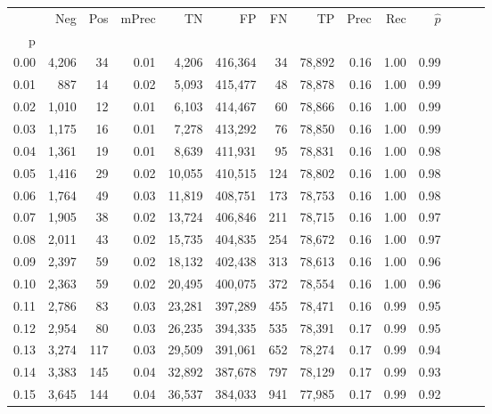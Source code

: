 \begin{tabular}{rrrrrrrrrrrrrr}
\toprule
{} &    Neg &    Pos & mPrec &       TN &       FP &      FN &      TP &  Prec &   Rec & $\hat{p}$ \\
p    &        &        &       &          &          &         &         &       &       &           \\
\midrule
0.00 &  4,206 &     34 &  0.01 &    4,206 &  416,364 &      34 &  78,892 &  0.16 &  1.00 &      0.99 \\
0.01 &    887 &     14 &  0.02 &    5,093 &  415,477 &      48 &  78,878 &  0.16 &  1.00 &      0.99 \\
0.02 &  1,010 &     12 &  0.01 &    6,103 &  414,467 &      60 &  78,866 &  0.16 &  1.00 &      0.99 \\
0.03 &  1,175 &     16 &  0.01 &    7,278 &  413,292 &      76 &  78,850 &  0.16 &  1.00 &      0.99 \\
0.04 &  1,361 &     19 &  0.01 &    8,639 &  411,931 &      95 &  78,831 &  0.16 &  1.00 &      0.98 \\
0.05 &  1,416 &     29 &  0.02 &   10,055 &  410,515 &     124 &  78,802 &  0.16 &  1.00 &      0.98 \\
0.06 &  1,764 &     49 &  0.03 &   11,819 &  408,751 &     173 &  78,753 &  0.16 &  1.00 &      0.98 \\
0.07 &  1,905 &     38 &  0.02 &   13,724 &  406,846 &     211 &  78,715 &  0.16 &  1.00 &      0.97 \\
0.08 &  2,011 &     43 &  0.02 &   15,735 &  404,835 &     254 &  78,672 &  0.16 &  1.00 &      0.97 \\
0.09 &  2,397 &     59 &  0.02 &   18,132 &  402,438 &     313 &  78,613 &  0.16 &  1.00 &      0.96 \\
0.10 &  2,363 &     59 &  0.02 &   20,495 &  400,075 &     372 &  78,554 &  0.16 &  1.00 &      0.96 \\
0.11 &  2,786 &     83 &  0.03 &   23,281 &  397,289 &     455 &  78,471 &  0.16 &  0.99 &      0.95 \\
0.12 &  2,954 &     80 &  0.03 &   26,235 &  394,335 &     535 &  78,391 &  0.17 &  0.99 &      0.95 \\
0.13 &  3,274 &    117 &  0.03 &   29,509 &  391,061 &     652 &  78,274 &  0.17 &  0.99 &      0.94 \\
0.14 &  3,383 &    145 &  0.04 &   32,892 &  387,678 &     797 &  78,129 &  0.17 &  0.99 &      0.93 \\
0.15 &  3,645 &    144 &  0.04 &   36,537 &  384,033 &     941 &  77,985 &  0.17 &  0.99 &      0.92 \\

\end{tabular}
